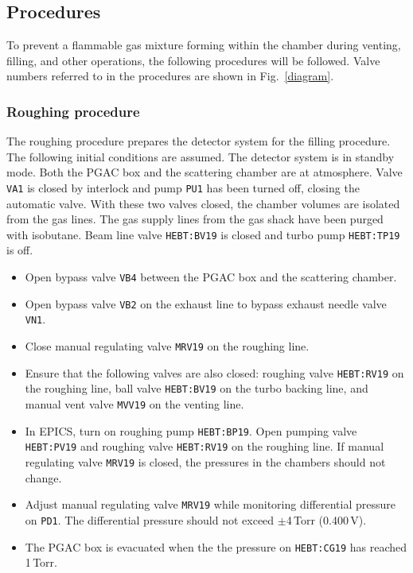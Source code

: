 \subsection{Procedures}
\label{procedures}
To prevent a flammable gas mixture forming within the chamber during venting, filling, and other operations,
the following procedures will be followed. Valve numbers referred to in the procedures are shown in Fig.~\ref{diagram}.
\subsubsection{Roughing procedure}
The roughing procedure prepares the detector system for the filling procedure.
The following initial conditions are assumed.  The detector system is in standby mode. Both the PGAC box and the scattering chamber are at atmosphere. Valve \texttt{VA1} is closed by interlock and pump \texttt{PU1} has been turned off, closing the automatic valve.  With these two valves closed, the chamber volumes are isolated from the gas lines.  The gas supply lines from the gas shack have been purged with isobutane.  Beam line valve  \texttt{HEBT:BV19} is closed and turbo pump  \texttt{HEBT:TP19} is off. 
\begin{itemize}
\setlength{\itemsep}{0pt}
\setlength{\parskip}{0pt}
\setlength{\parsep}{0pt}%
\item Open bypass valve \texttt{VB4} between the PGAC box and the scattering chamber.
\item Open bypass valve \texttt{VB2} on the exhaust line to bypass exhaust needle valve \texttt{VN1}.
\item Close manual regulating valve \texttt{MRV19} on the roughing line.
\item Ensure that the following valves are also closed: roughing valve \texttt{HEBT:RV19} on the roughing line, ball valve \texttt{HEBT:BV19} on the turbo backing line, and manual vent valve \texttt{MVV19} on the venting line.

\item In EPICS, turn on roughing pump \texttt{HEBT:BP19}. Open pumping valve \texttt{HEBT:PV19} and roughing valve \texttt{HEBT:RV19} on the roughing line. If manual regulating valve \texttt{MRV19} is closed, the pressures in the chambers should not change.
\item Adjust manual regulating valve \texttt{MRV19}  while monitoring differential pressure on \texttt{PD1}.  The differential pressure should not exceed $\pm$4\,Torr (0.400\,V).
\item The PGAC box is %
 evacuated when the the pressure on \texttt{HEBT:CG19} has reached 1\,Torr.%
\end{itemize}

